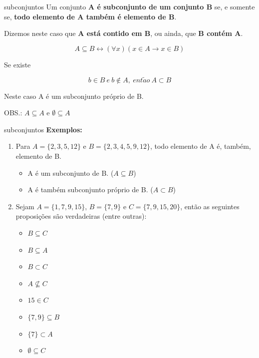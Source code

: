 \documentclass[aspectratio=169]{beamer}
\begin{document}
\begin{frame}{subconjuntos}
    Um conjunto \textbf{A é subconjunto de um conjunto B} se, e somente se, \textbf{todo elemento de A também é elemento de B}.

    \vspace{4mm}
    Dizemos neste caso que \textbf{A está contido em B}, ou ainda, que \textbf{B contém A}.

    \[ A \subseteq  B \leftrightarrow (\forall x)(x \in A \rightarrow x \in B )\]

    Se existe

    \[ b \in B ~ e ~ b \notin A, ~ ent\tilde{a}o ~ A \subset B \]

    \vspace{4mm}
    Neste caso A é um subconjunto próprio de B.

    \vspace{4mm} 
    OBS.: $A \subseteq A$ e $ \emptyset \subseteq  A$
\end{frame}


\begin{frame}{subconjuntos}
    \textbf{Exemplos:}
    \vspace{4mm}

    \begin{enumerate}
        \item Para $A=\{2, 3, 5, 12\}$ e $B=\{2, 3, 4, 5, 9, 12\}$, todo elemento de A é, também, elemento de B.
        \begin{itemize}
            \item A é um subconjunto de B. ($A \subseteq B$)
            \item A é também subconjunto próprio de B. ($A \subset B$)
        \end{itemize}

        \item Sejam $A=\{1, 7, 9, 15\}$, $B=\{7, 9\}$ e $C=\{7, 9, 15,20\}$, então as seguintes proposições são verdadeiras (entre outras):
        \begin{multicols}{2}
            \begin{itemize}
                \item $B \subseteq  C$
                \item $B \subseteq  A$
                \item $B \subset  C$
                \item $A \nsubseteq C$
                \item $15 \in C$
                \item $\{7, 9\} \subseteq B$
                \item $\{7\} \subset A$
                \item $ \emptyset \subseteq C$
            \end{itemize}
    \end{multicols}
    \end{enumerate}
    
\end{frame}
\end{document}
